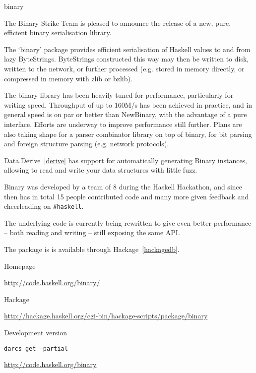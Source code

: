 \begin{hcarentry}{binary}
\label{binary}
\makeheader

The Binary Strike Team is pleased to announce the release of a new,
pure, efficient binary serialisation library.

The `binary' package provides efficient serialisation of Haskell values
to and from lazy ByteStrings. ByteStrings constructed this way may then
be written to disk, written to the network, or further processed (e.g.
stored in memory directly, or compressed in memory with zlib or bzlib).

The binary library has been heavily tuned for performance, particularly for
writing speed. Throughput of up to 160M/s has been achieved in practice, and
in general speed is on par or better than NewBinary, with the advantage of a
pure interface. Efforts are underway to improve performance still further.
Plans are also taking shape for a parser combinator library on top of
binary, for bit parsing and foreign structure parsing (e.g. network
protocols).

Data.Derive~\cref{derive} has support for automatically generating Binary
instances, allowing to read and write your data structures with little fuzz.

Binary was developed by a team of 8 during the Haskell Hackathon, and since
then has in total 15 people contributed code and many more given feedback
and cheerleading on \verb|#haskell|.

The underlying code is currently being rewritten to give even better
performance -- both reading and writing -- still exposing the same API.

The package is is available through Hackage~\cref{hackagedb}.

\FurtherReading
\begin{compactitem}
\item Homepage

  \url{http://code.haskell.org/binary/}
\item Hackage

  \url{http://hackage.haskell.org/cgi-bin/hackage-scripts/package/binary}
\item Development version

  \texttt{darcs get --partial}

  \url{http://code.haskell.org/binary}
\end{compactitem}
\end{hcarentry}
